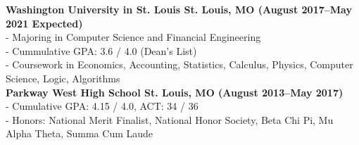 \documentclass[12pt]{article}
\begin{document}
\begin{titlepage}
		\begin{addmargin}[1em]{0em}
			\textbf{Washington University in St. Louis St. Louis, MO \hfill (August 2017–May 2021 Expected)}\\
- Majoring in Computer Science and Financial Engineering\\
- Cummulative GPA: 3.6 / 4.0 (Dean's List)\\
- Coursework in Economics, Accounting, Statistics, Calculus, Physics, Computer Science, Logic, Algorithms\\
			\textbf{Parkway West High School St. Louis, MO \hfill (August 2013–May 2017)}\\
- Cumulative GPA: 4.15 / 4.0, ACT: 34 / 36\\
- Honors: National Merit Finalist, National Honor Society, Beta Chi Pi, Mu Alpha Theta, Summa Cum Laude \\
		\end{addmargin}
	\end{titlepage}
\end{document}
